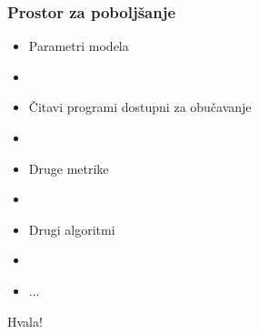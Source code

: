 \documentclass[14pt]{beamer}
\begin{document}
\begin{frame}
\frametitle{Prostor za poboljšanje}

\begin{itemize}
\item Parametri modela
\item[]
\item Čitavi programi dostupni za obučavanje
\item[]
\item Druge metrike
\item[]
\item Drugi algoritmi
\item[]
\item ...
\end{itemize}

\end{frame}


\begin{frame}
\Huge{\centerline{Hvala!}}
\end{frame}

\end{document}
